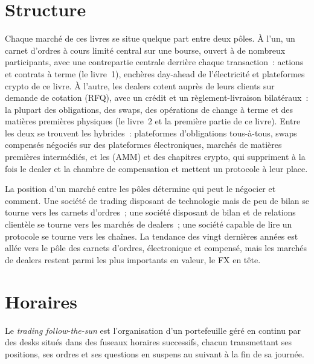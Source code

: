 \section{Structure}

Chaque marché de ces livres se situe quelque part entre deux pôles. À l'un, un carnet d'ordres à cours limité central sur une bourse, ouvert à de nombreux participants, avec une
contrepartie centrale derrière chaque transaction~: actions et contrats à terme (le livre~1), enchères day-ahead de l'électricité et plateformes crypto de ce livre. À l'autre,
les dealers cotent auprès de leurs clients sur demande de cotation (RFQ), avec un crédit et un règlement-livraison bilatéraux~: la plupart des obligations, des swaps, des opérations de change à terme et des matières premières physiques (le
livre~2 et la première partie de ce livre). Entre les deux se trouvent les hybrides~: plateformes d'obligations tous-à-tous, swaps compensés négociés sur des plateformes électroniques,
marchés de matières premières intermédiés, et les  (AMM) et  des chapitres crypto, qui suppriment à la fois le dealer et la
chambre de compensation et mettent un protocole à leur place.

La position d'un marché entre les pôles détermine qui peut le négocier et comment. Une société de trading disposant de technologie mais de peu de bilan se tourne vers les carnets d'ordres~;
une société disposant de bilan et de relations clientèle se tourne vers les marchés de dealers~; une société capable de lire un protocole se tourne vers les chaînes. La tendance des
vingt dernières années est allée vers le pôle des carnets d'ordres, électronique et compensé, mais les marchés de dealers restent parmi les plus importants en valeur, le FX en tête.

\section{Horaires}

\begin{definition}\label{def:m3:a-map-of-all-markets:sun}
Le \emph{trading follow-the-sun} est l'organisation d'un portefeuille géré en continu par des desks situés dans des
fuseaux horaires successifs, chacun transmettant ses positions, ses ordres et ses questions en suspens au suivant à la fin de sa journée.
\end{definition}

